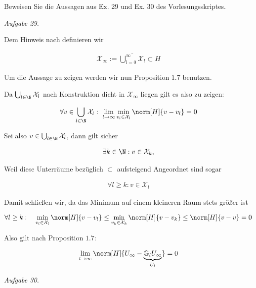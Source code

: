 
\begin{exercise}

Beweisen Sie die Aussagen aus Ex. 29 und Ex. 30 des Vorlesungsskriptes.

\end{exercise}


\begin{solution}

\textit{Aufgabe 29.}

Dem Hinweis nach definieren wir

\begin{align*}
  \mathcal{X}_\infty
  :=
  \overline{\bigcup_{l=0}^\infty \mathcal{X}_l}
  \subset H
\end{align*}

Um die Aussage zu zeigen werden wir nun Proposition $1.7$ benutzen.


Da $\bigcup_{l \in \N} \mathcal{X}_l$ nach Konstruktion dicht in $\mathcal{X}_\infty$ liegen gilt es also zu zeigen:

\begin{align*}
  \forall v \in \bigcup_{l \in \N} \mathcal{X}_l: ~
  \lim_{l \to \infty} \min_{v_l \in \mathcal{X}_l}
  \norm[H]{v - v_l} = 0
\end{align*}

Sei also $v \in \bigcup_{l \in \N} \mathcal{X}_l$, dann gilt sicher

\begin{align*}
  \exists k \in \N: v \in \mathcal{X}_k,
\end{align*}

Weil diese Unterräume bezüglich $\subset$ aufsteigend Angeordnet sind sogar

\begin{align*}
  \forall l \geq k: v \in \mathcal{X}_l
\end{align*}

Damit schließen wir, da das Minimum auf einem kleineren Raum stets größer ist

\begin{align*}
  \forall l \geq k: \quad
  \min_{v_l \in \mathcal{X}_l} \norm[H]{v - v_l}
  \leq
  \min_{v_k \in \mathcal{X}_k} \norm[H]{v - v_k}
  \leq
  \norm[H]{v-v}
  =
  0
\end{align*}

Also gilt nach Proposition $1.7$:

\begin{align*}
  \lim_{l \to \infty} \norm[H]{U_\infty - \underbrace{\mathbb{G}_l U_\infty}_{U_l}}
  =
  0
\end{align*}

\textit{Aufgabe 30.}
\end{solution}

